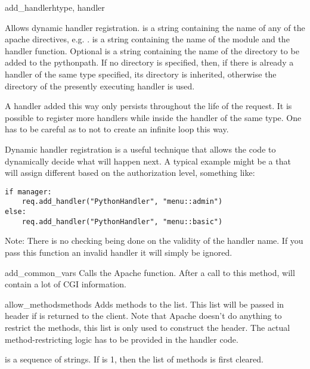 \begin{methoddesc}[Request]{add_handler}{htype, handler}

Allows dynamic handler registration.  is a string
containing the name of any of the apache 
directives, e.g. .  is a string
containing the name of the module and the handler function.  Optional
 is a string containing the name of the directory to be added
to the pythonpath. If no directory is specified, then, if there is
already a handler of the same type specified, its directory is
inherited, otherwise the directory of the presently executing handler
is used.
                  
A handler added this way only persists throughout the life of the
request. It is possible to register more handlers while inside the
handler of the same type. One has to be careful as to not to create an
infinite loop this way.

Dynamic handler registration is a useful technique that allows the
code to dynamically decide what will happen next. A typical example
might be a  that will assign different
 based on the authorization level, something like:

\begin{verbatim}
if manager:
    req.add_handler("PythonHandler", "menu::admin")
else:
    req.add_handler("PythonHandler", "menu::basic")
\end{verbatim}                              

Note: There is no checking being done on the validity of the handler
name. If you pass this function an invalid handler it will simply be
ignored.
\end{methoddesc}

\begin{methoddesc}[Request]{add_common_vars}{}
Calls the Apache  function. After a
call to this method,  will contain a
lot of CGI information.
\end{methoddesc}

\begin{methoddesc}[Request]{allow_methods}{methods}
Adds methods to the  list. This list
will be passed in  header if 
is returned to the client. Note that Apache doesn't do anything to restrict
the methods, this list is only used to construct the header. The actual
method-restricting logic has to be provided in the handler code.

 is a sequence of strings. If  is 1, then
the list of methods is first cleared.
\end{methoddesc}

